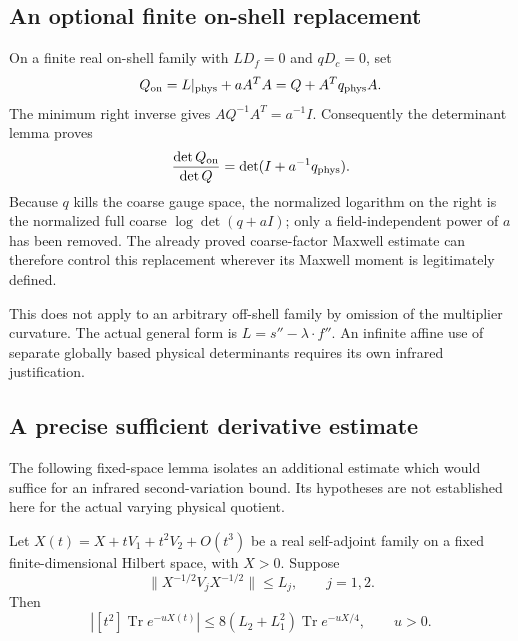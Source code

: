 \subsection{An optional finite on-shell replacement}
\label{pvs-onshell-section}

On a finite real on-shell family with
\(LD_f=0\) and \(qD_c=0\), set
\[
 Q_{\rm on}=L|_{\rm phys}+aA^TA=Q+A^Tq_{\rm phys}A.
\]
The minimum right inverse gives \(AQ^{-1}A^T=a^{-1}I\).
Consequently the determinant lemma proves
\begin{equation}
 \frac{\det Q_{\rm on}}{\det Q}
   =\det(I+a^{-1}q_{\rm phys}).
 \label{pvs-onshell-determinant}
\end{equation}
Because \(q\) kills the coarse gauge space, the normalized
logarithm on the right is the normalized full coarse
\(\log\det(q+aI)\); only a field-independent power of \(a\)
has been removed.
The already proved coarse-factor Maxwell estimate can therefore
control this replacement wherever its Maxwell moment is
legitimately defined.

This does not apply to an arbitrary off-shell family by omission
of the multiplier curvature.
The actual general form is
\(L=s''-\lambda\cdot f''\).
An infinite affine use of separate globally based physical
determinants requires its own infrared justification.

\subsection{A precise sufficient derivative estimate}
\label{pvs-vertex-section}

The following fixed-space lemma isolates an additional estimate
which would suffice for an infrared second-variation bound.
Its hypotheses are not established here for the actual varying
physical quotient.

\begin{lemma}
\label{pvs-vertex-lemma}
Let
\(X(t)=X+tV_1+t^2V_2+O(t^3)\)
be a real self-adjoint family on a fixed finite-dimensional
Hilbert space, with \(X>0\). Suppose
\begin{equation}
 \|X^{-1/2}V_jX^{-1/2}\|\le L_j,\qquad j=1,2.
 \label{pvs-vertex-hyp}
\end{equation}
Then
\begin{equation}
 \left|[t^2]\operatorname{Tr}e^{-uX(t)}\right|
 \le8(L_2+L_1^2)\operatorname{Tr}e^{-uX/4},
 \qquad u>0.
 \label{pvs-vertex-bound}
\end{equation}
\end{lemma}

